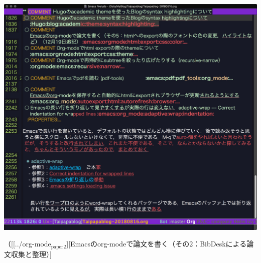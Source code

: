 \documentclass[autodetect-engine,dvipdfmx,12pt,a4paper,ja=standard]{bxjsarticle}
\begin{document}
\begin{enumerate}
\includegraphics[width=.9\linewidth]{./static/img/After_adaptive.jpg}



（[[../org-mode\(_{\text{paper}}\)\(_{\text{2}}\)][Emacsのorg-modeで論文を書く（その2：BibDeskによる論文収集と整理）]
\end{enumerate}
\end{document}
